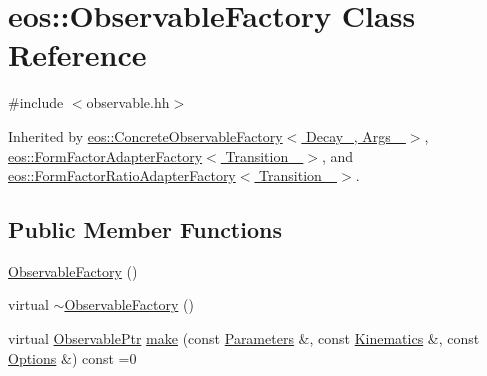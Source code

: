 \hypertarget{classeos_1_1ObservableFactory}{
\section{eos::ObservableFactory Class Reference}
\label{classeos_1_1ObservableFactory}
}


{\ttfamily \#include $<$observable.hh$>$}

Inherited by \hyperlink{classeos_1_1ConcreteObservableFactory}{eos::ConcreteObservableFactory$<$ Decay\_\-, Args\_\- $>$}, \hyperlink{classeos_1_1FormFactorAdapterFactory}{eos::FormFactorAdapterFactory$<$ Transition\_\- $>$}, and \hyperlink{classeos_1_1FormFactorRatioAdapterFactory}{eos::FormFactorRatioAdapterFactory$<$ Transition\_\- $>$}.\subsection*{Public Member Functions}
\begin{DoxyCompactItemize}
\item 
\hyperlink{classeos_1_1ObservableFactory_a74df47eaecec916d669606974695d6d9}{ObservableFactory} ()
\item 
virtual \hyperlink{classeos_1_1ObservableFactory_ae4f3c0da09a9d556b42ffe2d57d24c82}{$\sim$ObservableFactory} ()
\item 
virtual \hyperlink{namespaceeos_a470e5dd806bd129080f1aa0c2954646f}{ObservablePtr} \hyperlink{classeos_1_1ObservableFactory_ac338d98049d8db85548aab9d3c74bcda}{make} (const \hyperlink{classeos_1_1Parameters}{Parameters} \&, const \hyperlink{classeos_1_1Kinematics}{Kinematics} \&, const \hyperlink{classeos_1_1Options}{Options} \&) const =0
\end{DoxyCompactItemize}


